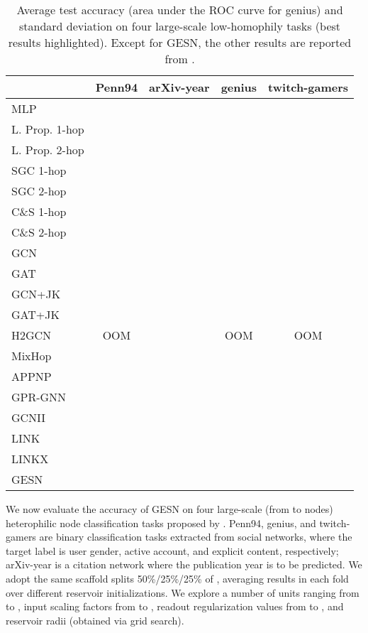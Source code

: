 \documentclass[final,5p,times,twocolumn]{elsarticle}
\begin{document}
\begin{table*}
	\centering
	\begin{tabular}{lcccc}
		\toprule
		 & \textbf{Penn94} & \textbf{arXiv-year} & \textbf{genius} & \textbf{twitch-gamers} \\
		\midrule
		MLP &  &  &  &  \\
		\midrule
		L. Prop. 1-hop &  &  &  &  \\
		L. Prop. 2-hop &  &  &  &  \\
		SGC 1-hop &  &  &  &  \\
		SGC 2-hop &  &  &  &  \\
		C\&S 1-hop &  &  &  &  \\
		C\&S 2-hop &  &  &  &  \\
		\midrule
		GCN &  &  &  &  \\
		GAT &  &  &  &  \\
		GCN+JK &  &  &  &  \\
		GAT+JK &  &  &  &  \\
		\midrule
		H2GCN & OOM &  & OOM & OOM \\
		MixHop &  &  &  &  \\
		APPNP &  &  &  &  \\
		GPR-GNN &  &  &  &  \\
		GCNII &  &  &  &  \\
		\midrule
		LINK &  &  &  &  \\
		LINKX &  &  &  &  \\
		\midrule
		GESN &  &  &  &  \\
		\bottomrule
	\end{tabular}
\caption{Average test accuracy (area under the ROC curve for genius) and standard deviation on four large-scale low-homophily tasks (best results highlighted). Except for GESN, the other results are reported from \cite{Lim2021}.}
\label{tab:experiments-large}
\end{table*}

We now evaluate the accuracy of GESN on four large-scale (from  to  nodes) heterophilic node classification tasks proposed by \cite{Lim2021}.
Penn94, genius, and twitch-gamers are binary classification tasks extracted from social networks, where the target label is user gender, active account, and explicit content, respectively; arXiv-year is a citation network where the publication year is to be predicted.
We adopt the same  scaffold splits 50\%/25\%/25\% of \cite{Lim2021}, averaging results in each fold over  different reservoir initializations.
We explore a number of units ranging from  to , input scaling factors from  to , readout regularization values from  to , and reservoir radii  (obtained via grid search).
\end{document}
